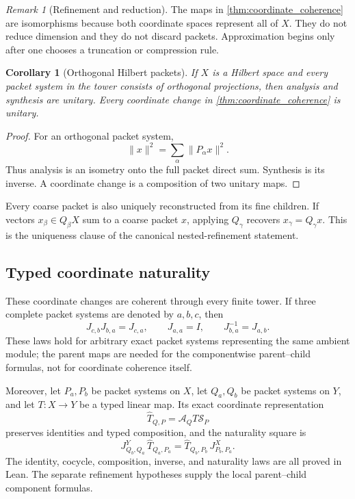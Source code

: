 \documentclass[11pt,a4paper]{article}
\newtheorem{corollary}[corollary]{Corollary}
\theoremstyle{definition}
\theoremstyle{remark}
\newtheorem{remark}[remark]{Remark}
\providecommand{\cA}{\mathcal A}
\providecommand{\cS}{\mathcal S}
\theoremstyle{definition}\newtheorem{construction}[theorem]{Construction}\newtheorem{certificate}[theorem]{Numerical Certificate}
\theoremstyle{remark}\newtheorem{boundary}[theorem]{Boundary}
\begin{document}
\begin{remark}[Refinement and reduction]\label{rem:refinement_reduction}
The maps in \cref{thm:coordinate_coherence} are isomorphisms because both coordinate spaces represent all of $X$.  They do not reduce dimension and they do not discard packets.  Approximation begins only after one chooses a truncation or compression rule.
\end{remark}

\begin{corollary}[Orthogonal Hilbert packets]\label{cor:orthogonal_isometry}
If $X$ is a Hilbert space and every packet system in the tower consists of orthogonal projections, then analysis and synthesis are unitary.  Every coordinate change in \cref{thm:coordinate_coherence} is unitary.
\end{corollary}

\begin{proof}
For an orthogonal packet system,
\[
\|x\|^2=\sum_\alpha\|P_\alpha x\|^2.
\]
Thus analysis is an isometry onto the full packet direct sum.  Synthesis is its inverse.  A coordinate change is a composition of two unitary maps.
\end{proof}

Every coarse packet is also uniquely reconstructed from its fine children.  If vectors $x_\beta\in Q_\beta X$ sum to a coarse packet $x$, applying $Q_\gamma$ recovers $x_\gamma=Q_\gamma x$.  This is the uniqueness clause of the canonical nested-refinement statement.

\subsection{Typed coordinate naturality}
These coordinate changes are coherent through every finite tower. If three
complete packet systems are denoted by $a,b,c$, then
\[
J_{c,b}J_{b,a}=J_{c,a},
\qquad J_{a,a}=I,
\qquad J_{b,a}^{-1}=J_{a,b}.
\]
These laws hold for arbitrary exact packet systems representing the same
ambient module; the parent maps are needed for the componentwise
parent--child formulas, not for coordinate coherence itself.

Moreover, let $P_a,P_b$ be packet systems on $X$, let $Q_a,Q_b$ be packet
systems on $Y$, and let $T:X\to Y$ be a typed linear map. Its exact coordinate
representation
\[
\widehat T_{Q,P}=\cA_QT\cS_P
\]
preserves identities and typed composition, and the naturality square is
\[
\boxed{
J^Y_{Q_b,Q_a}\,\widehat T_{Q_a,P_a}
=
\widehat T_{Q_b,P_b}\,J^X_{P_b,P_a}.
}
\]
The identity, cocycle, composition, inverse, and naturality laws are all proved
in Lean. The separate refinement hypotheses supply the local parent--child
component formulas.
\end{document}
